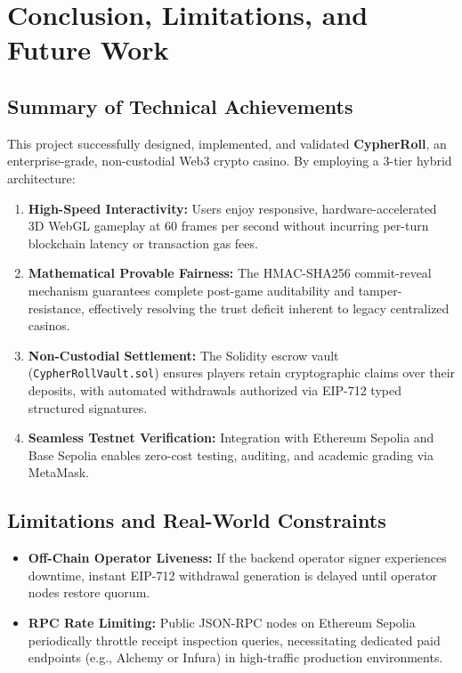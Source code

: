 \section{Conclusion, Limitations, and Future Work}

\subsection{Summary of Technical Achievements}
This project successfully designed, implemented, and validated \textbf{CypherRoll}, an enterprise-grade, non-custodial Web3 crypto casino. By employing a 3-tier hybrid architecture:
\begin{enumerate}[leftmargin=1.5em]
    \item \textbf{High-Speed Interactivity:} Users enjoy responsive, hardware-accelerated 3D WebGL gameplay at 60 frames per second without incurring per-turn blockchain latency or transaction gas fees.
    \item \textbf{Mathematical Provable Fairness:} The HMAC-SHA256 commit-reveal mechanism guarantees complete post-game auditability and tamper-resistance, effectively resolving the trust deficit inherent to legacy centralized casinos.
    \item \textbf{Non-Custodial Settlement:} The Solidity escrow vault (\texttt{CypherRollVault.sol}) ensures players retain cryptographic claims over their deposits, with automated withdrawals authorized via EIP-712 typed structured signatures.
    \item \textbf{Seamless Testnet Verification:} Integration with Ethereum Sepolia and Base Sepolia enables zero-cost testing, auditing, and academic grading via MetaMask.
\end{enumerate}

\subsection{Limitations and Real-World Constraints}
\begin{itemize}[leftmargin=1.5em]
    \item \textbf{Off-Chain Operator Liveness:} If the backend operator signer experiences downtime, instant EIP-712 withdrawal generation is delayed until operator nodes restore quorum.
    \item \textbf{RPC Rate Limiting:} Public JSON-RPC nodes on Ethereum Sepolia periodically throttle receipt inspection queries, necessitating dedicated paid endpoints (e.g., Alchemy or Infura) in high-traffic production environments.
\end{itemize}

